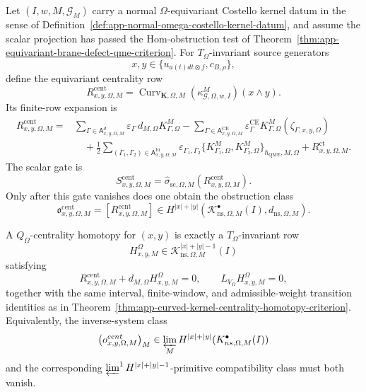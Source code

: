 \begin{prop}
\label{prop:app-qomega-centrality-homotopy-criterion}
  Let
  \((I,w,M,\mathcal G_M)\) carry a normal \(\Omega\)-equivariant
  Costello kernel datum in the sense of
  Definition~\ref{def:app-normal-omega-costello-kernel-datum}, and assume
  the scalar projection has passed the Hom-obstruction test of
  Theorem~\ref{thm:app-equivariant-brane-defect-qme-criterion}.  For
  \(T_\Omega\)-invariant source generators
  \[
    x,y\in\{u_{a(t)dt\otimes f},c_{B,\rho}\},
  \]
  define the equivariant centrality row
  \[
    R^{\mathrm{cent}}_{x,y,\Omega,M}
      =
    \operatorname{Curv}_{\mathbf K,\Omega,M}
      (\kappa^M_{\mathcal G,\Omega,w,I})(x\wedge y).
  \]
  Its finite-row expansion is
  \[
  \begin{aligned}
    R^{\mathrm{cent}}_{x,y,\Omega,M}
      ={}&
      \sum_{\Gamma\in\mathsf A_{x,y,\Omega,M}^{d}}
        \varepsilon_\Gamma\,d_{M,\Omega}K^M_{\Gamma,\Omega}
      -\sum_{\Gamma\in\mathsf A_{x,y,\Omega,M}^{\mathrm{CE}}}
        \varepsilon^{\mathrm{CE}}_\Gamma
        K^M_{\Gamma,\Omega}(\zeta_{\Gamma,x,y,\Omega})  \\
      &\quad
      +\frac12
      \sum_{(\Gamma_1,\Gamma_2)\in
        \mathsf A_{x,y,\Omega,M}^{\mathrm{br}}}
        \varepsilon_{\Gamma_1,\Gamma_2}
        \{K^M_{\Gamma_1,\Omega},
          K^M_{\Gamma_2,\Omega}\}_{\hbar_{\mathrm{QME}},M,\Omega}
      +R^{\mathrm{ct}}_{x,y,\Omega,M}.
  \end{aligned}
  \]
  The scalar gate is
  \[
    S^{\mathrm{cent}}_{x,y,\Omega,M}
      =
    \widehat\sigma_{\mathrm{sc},\Omega,M}
      (R^{\mathrm{cent}}_{x,y,\Omega,M}).
  \]
  Only after this gate vanishes does one obtain the obstruction class
  \[
    \mathfrak o^{\mathrm{cent}}_{x,y,\Omega,M}
      =
    [R^{\mathrm{cent}}_{x,y,\Omega,M}]
      \in
    H^{|x|+|y|}
      (\mathcal K^\bullet_{\mathrm{ns},\Omega,M}(I),
       d_{\mathrm{ns},\Omega,M}).
  \]

  A \(Q_\Omega\)-centrality homotopy for \((x,y)\) is exactly a
  \(T_\Omega\)-invariant row
  \[
    H^\Omega_{x,y,M}
      \in
    \mathcal K^{|x|+|y|-1}_{\mathrm{ns},\Omega,M}(I)
  \]
  satisfying
  \[
    R^{\mathrm{cent}}_{x,y,\Omega,M}
      +d_{M,\Omega}H^\Omega_{x,y,M}=0,
    \qquad
    L_{V_\Omega}H^\Omega_{x,y,M}=0,
    \label{eq:app-qomega-centrality-homotopy-equation}
  \]
  together with the same interval, finite-window, and admissible-weight
  transition identities as in
  Theorem~\ref{thm:app-curved-kernel-centrality-homotopy-criterion}.
  Equivalently, the inverse-system class
  \[
    \bigl(\mathfrak o^{\mathrm{cent}}_{x,y,\Omega,M}\bigr)_M
    \in
    \varprojlim_M
    H^{|x|+|y|}
      (\mathcal K^\bullet_{\mathrm{ns},\Omega,M}(I))
  \]
  and the corresponding
  \(\varprojlim^1 H^{|x|+|y|-1}\)-primitive compatibility class must both
  vanish.


\end{prop}
